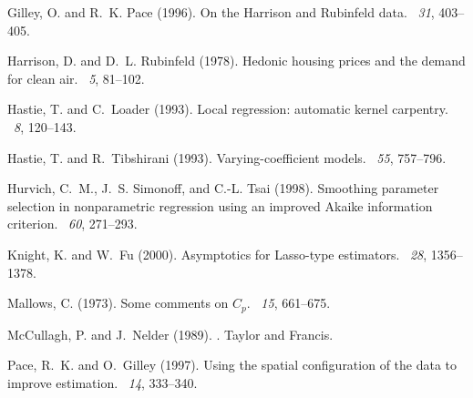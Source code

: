 \documentclass[authoryear,review, 12pt]{elsarticle}
\begin{document}
\begin{thebibliography}{}
Gilley, O. and R.~K. Pace (1996).
\newblock On the {H}arrison and {R}ubinfeld data.
~{\em 31},
  403--405.

Harrison, D. and D.~L. Rubinfeld (1978).
\newblock Hedonic housing prices and the demand for clean air.
~{\em 5},
  81--102.

Hastie, T. and C.~Loader (1993).
\newblock Local regression: automatic kernel carpentry.
~{\em 8}, 120--143.

Hastie, T. and R.~Tibshirani (1993).
\newblock Varying-coefficient models.
~{\em 55},
  757--796.

Hurvich, C.~M., J.~S. Simonoff, and C.-L. Tsai (1998).
\newblock Smoothing parameter selection in nonparametric regression using an
  improved {A}kaike information criterion.
~{\em 60},
  271--293.

Knight, K. and W.~Fu (2000).
\newblock Asymptotics for {L}asso-type estimators.
~{\em 28}, 1356--1378.

Mallows, C. (1973).
\newblock Some comments on ${C}_p$.
~{\em 15}, 661--675.

McCullagh, P. and J.~Nelder (1989).
.
\newblock Taylor and Francis.

Pace, R.~K. and O.~Gilley (1997).
\newblock Using the spatial configuration of the data to improve estimation.
~{\em 14},
  333--340.


\end{thebibliography}
\end{document}

